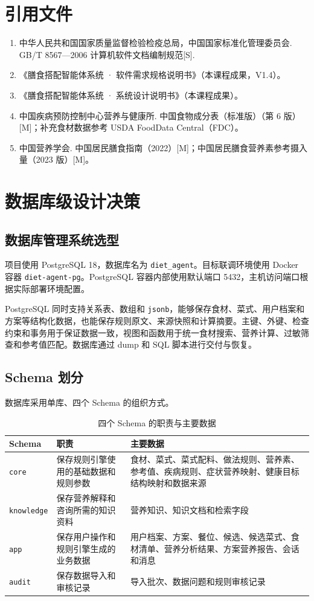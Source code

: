 \documentclass[12pt,a4paper]{ctexart}
\begin{document}
\section{引用文件}

\begin{enumerate}
\item 中华人民共和国国家质量监督检验检疫总局，中国国家标准化管理委员会. GB/T 8567---2006 计算机软件文档编制规范[S].
\item 《膳食搭配智能体系统 · 软件需求规格说明书》（本课程成果，V1.4）。
\item 《膳食搭配智能体系统 · 系统设计说明书》（本课程成果）。
\item 中国疾病预防控制中心营养与健康所. 中国食物成分表（标准版）（第 6 版）[M]；补充食材数据参考 USDA FoodData Central（FDC）。
\item 中国营养学会. 中国居民膳食指南（2022）[M]；中国居民膳食营养素参考摄入量（2023 版）[M]。
\end{enumerate}

\section{数据库级设计决策}

\subsection{数据库管理系统选型}

项目使用 PostgreSQL 18，数据库名为 \texttt{diet\_agent}。目标联调环境使用 Docker 容器 \texttt{diet-agent-pg}。PostgreSQL 容器内部使用默认端口 5432，主机访问端口根据实际部署环境配置。

PostgreSQL 同时支持关系表、数组和 \texttt{jsonb}，能够保存食材、菜式、用户档案和方案等结构化数据，也能保存规则原文、来源快照和计算摘要。主键、外键、检查约束和事务用于保证数据一致，视图和函数用于统一食材搜索、营养计算、过敏筛查和参考值匹配。数据库通过 dump 和 SQL 脚本进行交付与恢复。

\subsection{Schema 划分}

数据库采用单库、四个 Schema 的组织方式。

\begin{xltabular}{\linewidth}{P{1.8cm}Q{3.4cm}L}
\caption{四个 Schema 的职责与主要数据} \\
\toprule
\textbf{Schema} & \textbf{职责} & \textbf{主要数据} \\
\midrule
\endhead
\texttt{core} & 保存规则引擎使用的基础数据和规则参数 & 食材、菜式、菜式配料、做法规则、营养素、参考值、疾病规则、症状营养映射、健康目标结构映射和数据来源 \\
\texttt{knowledge} & 保存营养解释和咨询所需的知识资料 & 营养知识、知识文档和检索字段 \\
\texttt{app} & 保存用户操作和规则引擎生成的业务数据 & 用户档案、方案、餐位、候选、候选菜式、食材清单、营养分析结果、方案营养报告、会话和消息 \\
\texttt{audit} & 保存数据导入和审核记录 & 导入批次、数据问题和规则审核记录 \\
\bottomrule
\end{xltabular}
\end{document}
